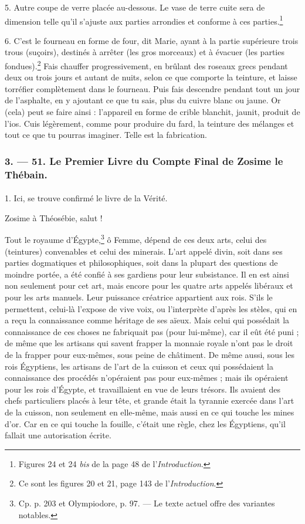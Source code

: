 \documentclass[a4paper, 11pt, oneside, polutonikogreek, french]{article}
\begin{document}
5. Autre coupe de verre placée au-dessous. Le vase de terre cuite sera de dimension telle qu'il s'ajuste aux parties arrondies et conforme à ces parties.\footnote{Figures 24 et 24 \emph{bis} de la page 48 de l'\emph{Introduction}.}

6. C'est le fourneau en forme de four, dit Marie, ayant à la partie supérieure trois trous (suçoirs), destinés à arrêter (les gros morceaux) et à évacuer (les parties fondues).\footnote{Ce sont les figures 20 et 21, page 143 de l'\emph{Introduction}.} Fais chauffer progressivement, en brûlant des roseaux grecs pendant deux ou trois jours et autant de nuits, selon ce que comporte la teinture, et laisse torréfier complètement dans le fourneau. Puis fais descendre pendant tout un jour de l'asphalte, en y ajoutant ce que tu sais, plus du cuivre blanc ou jaune. Or (cela) peut se faire ainsi : l'appareil en forme de crible blanchit, jaunit, produit de l'ios. Cuis légèrement, comme pour produire du fard, la teinture des mélanges et tout ce que tu pourras imaginer. Telle est la fabrication.

\bigskip
\centerline{\EightStarTaper}
\centerline{\EightStarTaper\EightStarTaper}
\bigskip

\subsubsection{3. --- 51. Le Premier Livre du Compte Final de Zosime le Thébain.}
\paragraph{}
1. Ici, se trouve confirmé le livre de la Vérité.

Zosime à Théosébie, salut !

Tout le royaume d'Égypte,\footnote{Cp. p. 203 et Olympiodore, p. 97. --- Le texte actuel offre des variantes notables.} ô Femme, dépend de ces deux arts, celui des (teintures) convenables et celui des minerais. L'art appelé divin, soit dans ses parties dogmatiques et philosophiques, soit dans la plupart des questions de moindre portée, a été confié à ses gardiens pour leur subsistance. Il en est ainsi non seulement pour cet art, mais encore pour les quatre arts appelés libéraux et pour les arts manuels. Leur puissance créatrice appartient aux rois. S'ils le permettent, celui-là l'expose de vive voix, ou l'interprète d'après les stèles, qui en a reçu la connaissance comme héritage de ses aïeux. Mais celui qui possédait la connaissance de ces choses ne fabriquait pas (pour lui-même), car il eût été puni ; de même que les artisans qui savent frapper la monnaie royale n'ont pas le droit de la frapper pour eux-mêmes, sous peine de châtiment. De même aussi, sous les rois Égyptiens, les artisans de l'art de la cuisson et ceux qui possédaient la connaissance des procédés n'opéraient pas pour eux-mêmes ; mais ils opéraient pour les rois d'Égypte, et travaillaient en vue de leurs trésors. Ils avaient des chefs particuliers placés à leur tête, et grande était la tyrannie exercée dans l'art de la cuisson, non seulement en elle-même, mais aussi en ce qui touche les mines d'or. Car en ce qui touche la fouille, c'était une règle, chez les Égyptiens, qu'il fallait une autorisation écrite.
\end{document}

